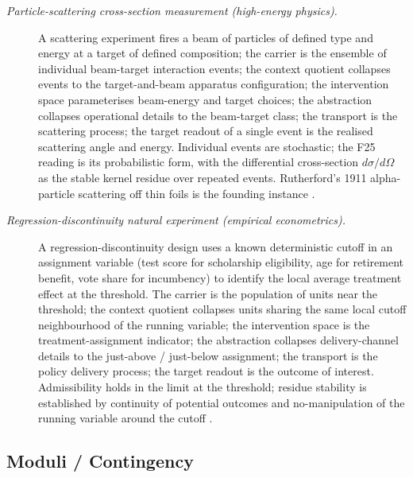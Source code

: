 \documentclass[11pt]{article}
\theoremstyle{definition}
\begin{document}
\begin{description}
\item[\emph{Particle-scattering cross-section
measurement (high-energy physics).}]
A scattering experiment fires a beam of particles of
defined type and energy at a target of defined
composition; the carrier is the ensemble of individual
beam-target interaction events; the context quotient
collapses events to the target-and-beam apparatus
configuration; the intervention space parameterises
beam-energy and target choices; the abstraction
collapses operational details to the beam-target class;
the transport is the scattering process; the target
readout of a single event is the realised scattering
angle and energy.  Individual events are stochastic; the
F25 reading is its probabilistic form, with the
differential cross-section \(d\sigma/d\Omega\) as the
stable kernel residue over repeated events.
Rutherford's 1911 alpha-particle scattering off thin
foils is the founding instance
\citep{Rutherford1911Scattering}.

\item[\emph{Regression-discontinuity natural experiment
(empirical econometrics).}]
A regression-discontinuity design uses a known
deterministic cutoff in an assignment variable (test
score for scholarship eligibility, age for retirement
benefit, vote share for incumbency) to identify the
local average treatment effect at the threshold.  The
carrier is the population of units near the threshold;
the context quotient collapses units sharing the same
local cutoff neighbourhood of the running variable; the
intervention space is the treatment-assignment
indicator; the abstraction collapses delivery-channel
details to the just-above / just-below assignment; the
transport is the policy delivery process; the target
readout is the outcome of interest.  Admissibility
holds in the limit at the threshold; residue stability
is established by continuity of potential outcomes and
no-manipulation of the running variable around the
cutoff \citep{ThistlethwaiteCampbell1960Regression}.
\end{description}

\subsection{Moduli / Contingency}\label{sec:status-records-coherence:moduli}
\end{document}
